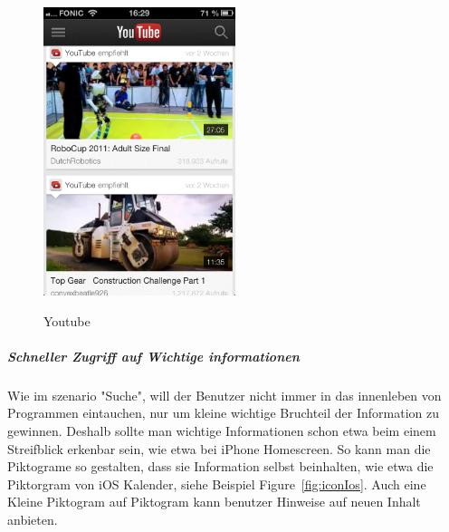 \begin{figure}[h]
	\caption{Youtube}
	\includegraphics[width=0.5\textwidth]{img/youtube.png}
	\label{fig:youtube}
\end{figure}




\subparagraph{Schneller Zugriff auf Wichtige informationen} 
\label{subp:subparagraph_name}

Wie im szenario "Suche", will der Benutzer nicht immer in das innenleben von Programmen eintauchen, nur um kleine wichtige Bruchteil der Information zu gewinnen. Deshalb sollte man wichtige Informationen schon etwa beim einem Streifblick erkenbar sein\cite[Seite 54]{mobileFrontier}\cite{Neil:2012uf},  wie etwa bei iPhone Homescreen. So kann man die Piktograme so gestalten, dass sie Information selbst beinhalten, wie etwa die Piktorgram von iOS Kalender, siehe Beispiel Figure~\ref{fig:iconIos}. Auch eine Kleine Piktogram auf Piktogram kann benutzer Hinweise auf neuen Inhalt anbieten.

